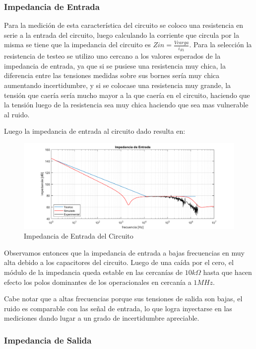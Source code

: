 \subsubsection{Impedancia de Entrada}

Para la medición de esta característica del circuito se coloco una resistencia en serie a la entrada del circuito, luego calculando la corriente que circula por la misma se tiene que la impedancia del circuito es $Zin = \frac{Vcarga}{i_{R1}}$. Para la selección la resistencia de testeo se utilizo uno cercano a los valores esperados de la impedancia de entrada, ya que si se pusiese una resistencia muy chica, la diferencia entre las tensiones medidas sobre sus bornes ser\'ia muy chica aumentando incertidumbre, y si se colocase una resistencia muy grande, la tensi\'on que caer\'ia ser\'ia mucho mayor a la que caer\'ia en el circuito, haciendo que la tensi\'on luego de la resistencia sea muy chica haciendo que sea mas vulnerable al ruido.

Luego la impedancia de entrada al circuito dado resulta en:

\begin{figure}[h]
    \centering
    \includegraphics[scale = 0.6]{../Ejercicio1-FiltroConGIC/Informe/zin.png}
    \caption{Impedancia de Entrada del Circuito}
    \label{ej1zin}
\end{figure}

Observamos entonces que la impedancia de entrada a bajas frecuencias en muy alta debido a los capacitores del circuito. Luego de una caída por el cero, el módulo de la impedancia queda estable en las cercanías de $10k\Omega$ hasta que hacen efecto los polos dominantes de los operacionales en cercanía a $1MHz$. 

Cabe notar que a altas frecuencias porque sus tensiones de salida son bajas, el ruido es comparable con las señal de entrada, lo que logra inyectarse en las mediciones dando lugar a un grado de incertidumbre apreciable.

\subsubsection{Impedancia de Salida}


